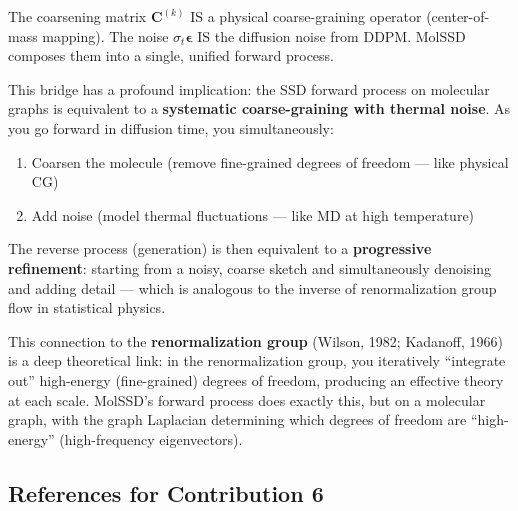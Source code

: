 \documentclass[12pt,a4paper]{article}
\begin{document}
The coarsening matrix $\bm{C}^{(k)}$ IS a physical coarse-graining operator (center-of-mass mapping). The noise $\sigma_t \bm{\epsilon}$ IS the diffusion noise from DDPM. MolSSD composes them into a single, unified forward process.

\begin{insightbox}
This bridge has a profound implication: the SSD forward process on molecular graphs is equivalent to a \textbf{systematic coarse-graining with thermal noise}. As you go forward in diffusion time, you simultaneously:
\begin{enumerate}
  \item Coarsen the molecule (remove fine-grained degrees of freedom --- like physical CG)
  \item Add noise (model thermal fluctuations --- like MD at high temperature)
\end{enumerate}
The reverse process (generation) is then equivalent to a \textbf{progressive refinement}: starting from a noisy, coarse sketch and simultaneously denoising and adding detail --- which is analogous to the inverse of renormalization group flow in statistical physics.
\end{insightbox}

This connection to the \textbf{renormalization group} (Wilson, 1982; Kadanoff, 1966) is a deep theoretical link: in the renormalization group, you iteratively ``integrate out'' high-energy (fine-grained) degrees of freedom, producing an effective theory at each scale. MolSSD's forward process does exactly this, but on a molecular graph, with the graph Laplacian determining which degrees of freedom are ``high-energy'' (high-frequency eigenvectors).

\subsection{References for Contribution 6}
\end{document}
